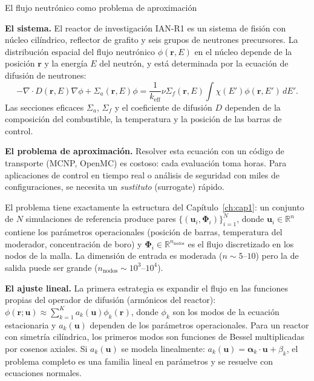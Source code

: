 
\begin{estrella}{El flujo neutrónico como problema de aproximación}
\label{sec:estrella1}

\textbf{El sistema.}
El reactor de investigación IAN-R1 es un sistema de fisión con núcleo
cilíndrico, reflector de grafito y seis grupos de neutrones precursores.
La distribución espacial del flujo neutrónico $\phi(\bm{r}, E)$ en el
núcleo depende de la posición $\bm{r}$ y la energía $E$ del neutrón, y
está determinada por la ecuación de difusión de neutrones:
\[
  -\nabla \cdot D(\bm{r},E)\nabla\phi + \Sigma_a(\bm{r},E)\phi
  = \frac{1}{k_{\text{eff}}}\nu\Sigma_f(\bm{r},E)\int \chi(E')
  \phi(\bm{r},E')\,dE'.
\]
Las secciones eficaces $\Sigma_a$, $\Sigma_f$ y el coeficiente de difusión
$D$ dependen de la composición del combustible, la temperatura y la
posición de las barras de control.

\textbf{El problema de aproximación.}
Resolver esta ecuación con un código de transporte (MCNP, OpenMC) es
costoso: cada evaluación toma horas. Para aplicaciones de control en
tiempo real o análisis de seguridad con miles de configuraciones, se
necesita un \textit{sustituto} (surrogate) rápido.

El problema tiene exactamente la estructura del Capítulo~\ref{ch:cap1}: un
conjunto de $N$ simulaciones de referencia produce pares
$\{(\bm{u}_i, \bm{\Phi}_i)\}_{i=1}^N$, donde $\bm{u}_i \in
\mathbb{R}^n$ contiene los parámetros operacionales (posición de barras,
temperatura del moderador, concentración de boro) y
$\bm{\Phi}_i \in \mathbb{R}^{n_{\text{nodos}}}$ es el flujo
discretizado en los nodos de la malla. La dimensión de entrada es
moderada ($n \sim 5$--$10$) pero la de salida puede ser grande
($n_{\text{nodos}} \sim 10^3$--$10^4$).

\textbf{El ajuste lineal.}
La primera estrategia es expandir el flujo en las funciones propias del
operador de difusión (armónicos del reactor): $\phi(\bm{r};\bm{u})
\approx \sum_{k=1}^K a_k(\bm{u})\phi_k(\bm{r})$, donde $\phi_k$ son
los modos de la ecuación estacionaria y $a_k(\bm{u})$ dependen de los
parámetros operacionales. Para un reactor con simetría cilíndrica, los
primeros modos son funciones de Bessel multiplicadas por cosenos axiales.
Si $a_k(\bm{u})$ se modela linealmente: $a_k(\bm{u}) = \bm{\alpha}_k
\cdot \bm{u} + \beta_k$, el problema completo es una familia lineal en
parámetros y se resuelve con ecuaciones normales.


\end{estrella}
